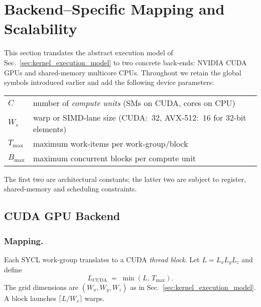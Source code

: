 \section{Backend–Specific Mapping and Scalability}
\label{sec:backend_scaling}

This section translates the abstract execution model of
Sec.~\ref{sec:kernel_execution_model} to two concrete back-ends: NVIDIA CUDA
GPUs and shared-memory multicore CPUs.  Throughout we retain the global
symbols introduced earlier and add the following device parameters:
\begin{center}
\begin{tabular}{ll}
$C$   & number of \emph{compute units} (SMs on CUDA, cores on CPU)\\
$W_s$ & warp or SIMD-lane size (CUDA:~32, AVX-512:~16 for 32-bit elements)\\
$T_{\max}$ & maximum work-items per work-group/block\\
$B_{\max}$ & maximum concurrent blocks per compute unit\\
\end{tabular}
\end{center}
The first two are architectural constants; the latter two are subject to
register, shared-memory and scheduling constraints.

\subsection{CUDA GPU Backend}
\label{subsec:cuda_backend}

\subsubsection{Mapping.}  Each SYCL work-group translates to a CUDA \emph{thread
block}.  Let $L=L_xL_yL_z$ and define
\[
  L_\text{CUDA} \;=\; \min(L,\,T_{\max}).
\]
The grid dimensions are $(W_x,W_y,W_z)$ as in
Sec.~\ref{sec:kernel_execution_model}.  A block launches $\lceil L/W_s\rceil$
warps.

